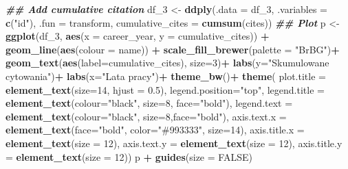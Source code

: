 \documentclass[
  12pt,
]{article}
\newenvironment{Shaded}{\begin{snugshade}}{\end{snugshade}}
\newcommand{\AttributeTok}[1]{\textcolor[rgb]{0.13,0.29,0.53}{#1}}
\newcommand{\ConstantTok}[1]{\textcolor[rgb]{0.56,0.35,0.01}{#1}}
\newcommand{\DecValTok}[1]{\textcolor[rgb]{0.00,0.00,0.81}{#1}}
\newcommand{\DocumentationTok}[1]{\textcolor[rgb]{0.56,0.35,0.01}{\textbf{\textit{#1}}}}
\newcommand{\FloatTok}[1]{\textcolor[rgb]{0.00,0.00,0.81}{#1}}
\newcommand{\FunctionTok}[1]{\textcolor[rgb]{0.13,0.29,0.53}{\textbf{#1}}}
\newcommand{\NormalTok}[1]{#1}
\newcommand{\OtherTok}[1]{\textcolor[rgb]{0.56,0.35,0.01}{#1}}
\newcommand{\SpecialCharTok}[1]{\textcolor[rgb]{0.81,0.36,0.00}{\textbf{#1}}}
\newcommand{\StringTok}[1]{\textcolor[rgb]{0.31,0.60,0.02}{#1}}
\begin{document}
\begin{Shaded}
\begin{Highlighting}[]
\DocumentationTok{\#\# Add cumulative citation}
\NormalTok{df\_3 }\OtherTok{\textless{}{-}} \FunctionTok{ddply}\NormalTok{(}\AttributeTok{.data =}\NormalTok{ df\_3,}
            \AttributeTok{.variables =} \FunctionTok{c}\NormalTok{(}\StringTok{"id"}\NormalTok{),}
            \AttributeTok{.fun =}\NormalTok{ transform,}
            \AttributeTok{cumulative\_cites =} \FunctionTok{cumsum}\NormalTok{(cites))}
\DocumentationTok{\#\# Plot}
\NormalTok{p }\OtherTok{\textless{}{-}} \FunctionTok{ggplot}\NormalTok{(df\_3, }\FunctionTok{aes}\NormalTok{(}\AttributeTok{x =}\NormalTok{ career\_year, }\AttributeTok{y =}\NormalTok{ cumulative\_cites)) }\SpecialCharTok{+}
  \FunctionTok{geom\_line}\NormalTok{(}\FunctionTok{aes}\NormalTok{(}\AttributeTok{colour =}\NormalTok{ name)) }\SpecialCharTok{+}
  \FunctionTok{scale\_fill\_brewer}\NormalTok{(}\AttributeTok{palette =} \StringTok{"BrBG"}\NormalTok{)}\SpecialCharTok{+}
  \FunctionTok{geom\_text}\NormalTok{(}\FunctionTok{aes}\NormalTok{(}\AttributeTok{label=}\NormalTok{cumulative\_cites), }\AttributeTok{size=}\DecValTok{3}\NormalTok{)}\SpecialCharTok{+}
  \FunctionTok{labs}\NormalTok{(}\AttributeTok{y=}\StringTok{"Skumulowane cytowania"}\NormalTok{)}\SpecialCharTok{+}
  \FunctionTok{labs}\NormalTok{(}\AttributeTok{x=}\StringTok{"Lata pracy"}\NormalTok{)}\SpecialCharTok{+}
  \FunctionTok{theme\_bw}\NormalTok{()}\SpecialCharTok{+}
  \FunctionTok{theme}\NormalTok{( }\AttributeTok{plot.title =} \FunctionTok{element\_text}\NormalTok{(}\AttributeTok{size=}\DecValTok{14}\NormalTok{, }\AttributeTok{hjust =} \FloatTok{0.5}\NormalTok{),}
         \AttributeTok{legend.position=}\StringTok{"top"}\NormalTok{,}
         \AttributeTok{legend.title =} \FunctionTok{element\_text}\NormalTok{(}\AttributeTok{colour=}\StringTok{"black"}\NormalTok{, }\AttributeTok{size=}\DecValTok{8}\NormalTok{, }\AttributeTok{face=}\StringTok{"bold"}\NormalTok{),}
         \AttributeTok{legend.text =} \FunctionTok{element\_text}\NormalTok{(}\AttributeTok{colour=}\StringTok{"black"}\NormalTok{, }\AttributeTok{size=}\DecValTok{8}\NormalTok{,}\AttributeTok{face=}\StringTok{"bold"}\NormalTok{),}
         \AttributeTok{axis.text.x =} \FunctionTok{element\_text}\NormalTok{(}\AttributeTok{face=}\StringTok{"bold"}\NormalTok{, }\AttributeTok{color=}\StringTok{"\#993333"}\NormalTok{, }\AttributeTok{size=}\DecValTok{14}\NormalTok{),}
         \AttributeTok{axis.title.x =} \FunctionTok{element\_text}\NormalTok{(}\AttributeTok{size =} \DecValTok{12}\NormalTok{),}
         \AttributeTok{axis.text.y =} \FunctionTok{element\_text}\NormalTok{(}\AttributeTok{size =} \DecValTok{12}\NormalTok{),}
         \AttributeTok{axis.title.y =} \FunctionTok{element\_text}\NormalTok{(}\AttributeTok{size =} \DecValTok{12}\NormalTok{))}
\NormalTok{p }\SpecialCharTok{+} \FunctionTok{guides}\NormalTok{(}\AttributeTok{size =} \ConstantTok{FALSE}\NormalTok{)}
\end{Highlighting}
\end{Shaded}
\end{document}
